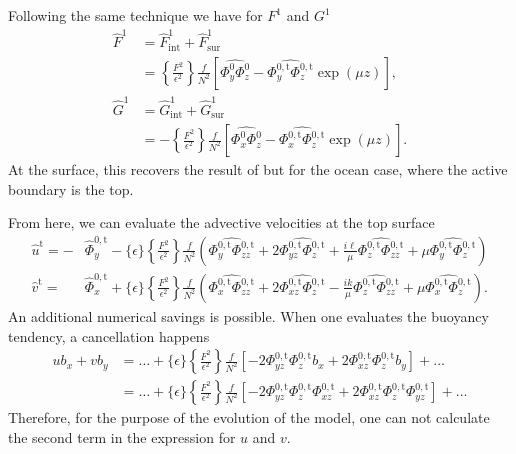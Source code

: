 \documentclass[11pt,letterpaper]{article}
\newcommand{\Ro}{\{\epsilon\}}
\newcommand{\Ub}{\left\{\frac{F^2}{\epsilon^2}\right\}}
\begin{document}
Following the same technique we have for $F^1$ and $G^1$
\begin{align}
    \hat{F}^1 &= \hat{F}^1_\text{int} + \hat{F}^1_\text{sur}\\
    &= \Ub \frac{f}{N^2} \left[\widehat{\Phi^0_y\Phi^0_z} - \widehat{\Phi^{0,\text{t}}_y\Phi^{0,\text{t}}_z} \exp\left(\mu z\right) \right],\\
    \hat{G}^1 &= \hat{G}^1_\text{int} + \hat{G}^1_\text{sur}\\
    &= -\Ub \frac{f}{N^2} \left[\widehat{\Phi^0_x\Phi^0_z} - \widehat{\Phi^{0,\text{t}}_x\Phi^{0,\text{t}}_z} \exp\left(\mu z\right) \right].
\end{align}
At the surface, this recovers the result of \citet[Appendix A]{HakimEtAl_02} but for the ocean case, where the active boundary is the top.

From here, we can evaluate the advective velocities at the top surface 
\begin{align}
    \hat u^\text{t} = -&\hat{\Phi}^{0,\text{t}}_y-\Ro \Ub \frac{f}{N^2} \left(\widehat{\Phi^{0,\text{t}}_y\Phi^{0,\text{t}}_{zz}}+2\widehat{\Phi^{0,\text{t}}_{yz}\Phi^{0,\text{t}}_z} + \frac{i\ell}{\mu}\widehat{\Phi^{0,\text{t}}_z\Phi^{0,\text{t}}_{zz}}  +\mu\widehat{\Phi^{0,\text{t}}_y \Phi^{0,\text{t}}_z} \right)\\
    \hat v^\text{t} =\; &\hat \Phi^{0,\text{t}}_x+\Ro \Ub \frac{f}{N^2} \left(\widehat{\Phi^{0,\text{t}}_{x}\Phi_{zz}^{0,\text{t}}}+2\widehat{\Phi^{0,\text{t}}_{xz}\Phi_z^{0,\text{t}}}- \frac{ik}{\mu}\widehat{\Phi^{0,\text{t}}_z\Phi^{0,\text{t}}_{zz}}  +\mu\widehat{\Phi^{0,\text{t}}_x \Phi^{0,\text{t}}_z}  \right).
\end{align}
An additional numerical savings is possible. When one evaluates the buoyancy tendency, a cancellation happens
\begin{align}
    ub_x+vb_y &= \dots+\Ro\Ub \frac{f}{N^2}\left[ -2\Phi^{0,\text{t}}_{yz}\Phi^{0,\text{t}}_zb_x+2\Phi^{0,\text{t}}_{xz}\Phi^{0,\text{t}}_zb_y \right]+ \dots\\
    &= \dots+\Ro\Ub \frac{f}{N^2}\left[ -2\Phi^{0,\text{t}}_{yz}\Phi^{0,\text{t}}_z\Phi^{0,\text{t}}_{xz}+2\Phi^{0,\text{t}}_{xz}\Phi^{0,\text{t}}_z\Phi^{0,\text{t}}_{yz} \right]+ \dots
\end{align}
Therefore, for the purpose of the evolution of the model, one can not calculate the second term in the expression for $u$ and $v$.
\end{document}
